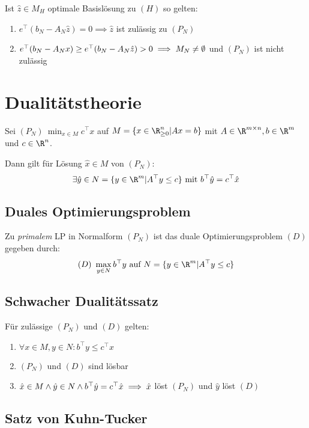 Ist \(\hat z \in M_H\) optimale Basislösung zu \((H)\) so gelten:

\begin{enumerate}[label=(\alph*)]
	\item \(e^\top (b_N - A_N \hat z) = 0 \implies \hat z\) ist zulässig zu \((P_N)\) 
	\item \(e^\top (b_N - A_N x) \geq e^\top (b_N - A_N \hat z) > 0 \\ \implies M_N \neq \emptyset\) und \((P_N)\) ist nicht zulässig
\end{enumerate}

\section*{Dualitätstheorie}

Sei \((P_N) \ \min_{x \in M} c^\top x\) auf \(M = \{ x \in \R_{\geq 0}^n | Ax=b \}\) mit \(A \in \R^{m \times n}, b \in \R^m\) und \(c \in \R^n\).

Dann gilt für Lösung \(\hat x \in M\) von \((P_N)\):
\[\exists \hat y \in N = \{ y \in \R^m | A^\top y \leq c \} \text{ mit } b^\top \hat y = c^\top \hat x\]

\subsection*{Duales Optimierungsproblem}

Zu \emph{primalem} LP in Normalform \((P_N)\) ist das duale Optimierungsproblem \((D)\) gegeben durch:
\[(D) \ \max_{y \in N} b^\top y \text{ auf } N = \{y \in \R^m | A^\top y \leq c\}\]

\subsection*{Schwacher Dualitätssatz}

Für zulässige \((P_N)\) und \((D)\) gelten:

\begin{enumerate}[label=(\alph*)]
	\item \(\forall x \in M, y \in N : b^\top y \leq c^\top x\)
	\item \((P_N)\) und \((D)\) sind lösbar
	\item \(\hat x \in M \land \hat y \in N \land b^\top \hat y = c^\top \hat x \\ \implies \hat x\) löst \((P_N)\) und \(\hat y\) löst \((D)\)
\end{enumerate}

\subsection*{Satz von Kuhn-Tucker}

